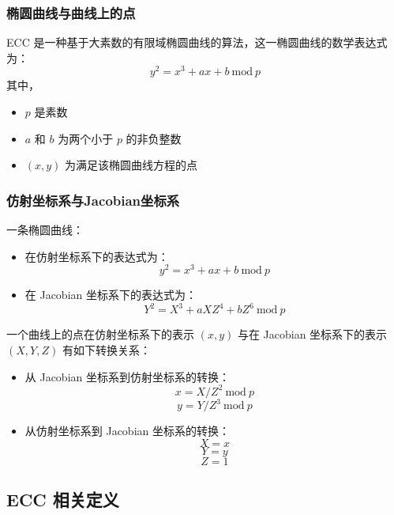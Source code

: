 \documentclass[main\_\_CN.tex]{subfiles}
\begin{document}
\subsubsection{椭圆曲线与曲线上的点}

ECC 是一种基于大素数的有限域椭圆曲线的算法，这一椭圆曲线的数学表达式为：
\[
{y}^{2} = {x}^{3} + {ax} + b \ \textrm{mod}\ p
\]
其中，
\begin{itemize}
    \item $p$ 是素数
    \item $a$ 和 $b$ 为两个小于 $p$ 的非负整数
    \item $(x, y)$ 为满足该椭圆曲线方程的点
\end{itemize}

\subsubsection{仿射坐标系与Jacobian坐标系}

一条椭圆曲线：
\begin{itemize}
    \item 在仿射坐标系下的表达式为：
    \[
    {y}^{2} = {x}^{3} + {ax} + b \ \textrm{mod}\ p
    \]
    \item 在 Jacobian 坐标系下的表达式为：
    \[
    {Y}^{2} = {X}^{3} + {aXZ}^{4} + {bZ}^{6} \ \textrm{mod}\ p
    \]
\end{itemize}

一个曲线上的点在仿射坐标系下的表示 $(x, y)$ 与在 Jacobian 坐标系下的表示 $(X, Y, Z)$ 有如下转换关系：

\begin{itemize}
    \item 从 Jacobian 坐标系到仿射坐标系的转换：
    \[
    x = X / {Z}^2 \ \textrm{mod}\ p
    \]
    \[
    y = Y / {Z}^3 \ \textrm{mod}\ p
    \]
    \item 从仿射坐标系到 Jacobian 坐标系的转换：
    \[ X = x \]
    \[ Y = y \]
    \[ Z = 1\]
\end{itemize}


\subsection{\chipname{} ECC 相关定义}
\end{document}
